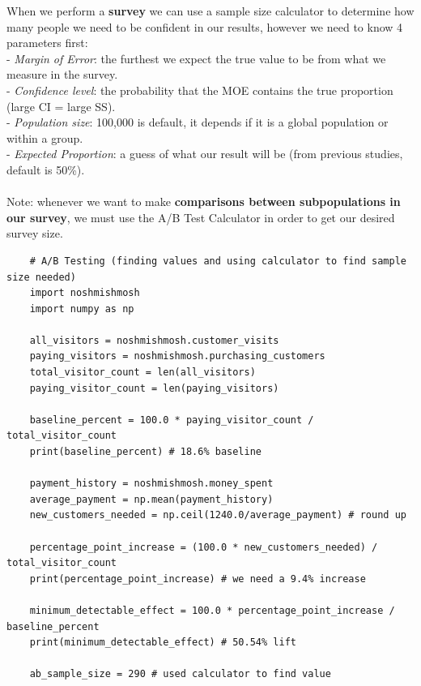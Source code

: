 \documentclass[11pt, a4paper]{article}
\begin{document}
\begin{spacing}{1.1}
	\noindent When we perform a \textbf{survey} we can use a sample size calculator to determine how many people we need to be confident in our results, however we need to know 4 parameters first: \\
	\hspace*{3mm} - \textit{Margin of Error}: the furthest we expect the true value to be from what we measure in the survey. \\
	\hspace*{3mm} - \textit{Confidence level}: the probability that the MOE contains the true proportion (large CI = large SS). \\
	\hspace*{3mm} - \textit{Population size}: 100,000 is default, it depends if it is a global population or within a group.  \\
	\hspace*{3mm} - \textit{Expected Proportion}: a guess of what our result will be (from previous studies, default is 50\%). \\~\\
	Note: whenever we want to make \textbf{comparisons between subpopulations in our survey}, we must use the A/B Test Calculator in order to get our desired survey size. 
	\begin{lstlisting}
	# A/B Testing (finding values and using calculator to find sample size needed)
	import noshmishmosh
	import numpy as np
	
	all_visitors = noshmishmosh.customer_visits
	paying_visitors = noshmishmosh.purchasing_customers 
	total_visitor_count = len(all_visitors)
	paying_visitor_count = len(paying_visitors)
	
	baseline_percent = 100.0 * paying_visitor_count / total_visitor_count
	print(baseline_percent) # 18.6% baseline
	
	payment_history = noshmishmosh.money_spent
	average_payment = np.mean(payment_history)
	new_customers_needed = np.ceil(1240.0/average_payment) # round up
	
	percentage_point_increase = (100.0 * new_customers_needed) / total_visitor_count
	print(percentage_point_increase) # we need a 9.4% increase
	
	minimum_detectable_effect = 100.0 * percentage_point_increase / baseline_percent
	print(minimum_detectable_effect) # 50.54% lift
	
	ab_sample_size = 290 # used calculator to find value \end{lstlisting}\vspace*{4mm}
	

\end{spacing}
\end{document}
